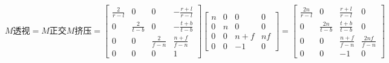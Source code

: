 $$
M透视= M正交M挤压=
\begin{bmatrix}
  \frac{2}{r-l} & 0 & 0 & -\frac{r+l}{r-l} \\
  0 & \frac{2}{t-b} & 0 & -\frac{t+b}{t-b} \\
  0 & 0 & \frac{2}{f-n} & \frac{n+f}{f-n} \\
  0 & 0 & 0 & 1
\end{bmatrix}
\begin{bmatrix}
  n & 0 & 0 & 0 \\
  0 & n & 0 & 0 \\
  0 & 0 & n + f & nf \\
  0 & 0 & -1 & 0
\end{bmatrix}
=
\begin{bmatrix}
  \frac{2n}{r-l} & 0 & \frac{r+l}{r-l} & 0 \\
  0 & \frac{2n}{t-b} & \frac{t+b}{t-b} & 0 \\
  0 & 0 & \frac{n + f}{f-n} & \frac{2nf}{f-n} \\
  0 & 0 & -1 & 0
\end{bmatrix}
$$